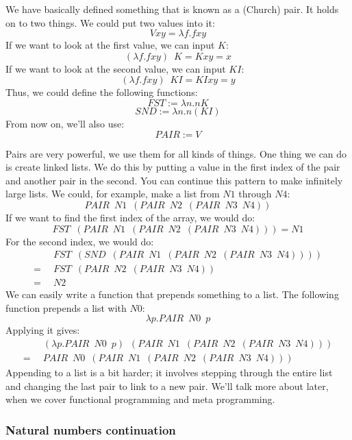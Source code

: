 \documentclass[11pt]{article}
\begin{document}
We have basically defined something that is known as a (Church) pair. It holds
on to two things. We could put two values into it:
\[Vxy=\lambda f.fxy\]
If we want to look at the first value, we can input \(K\):
\[(\lambda f.fxy)\enspace K=Kxy=x\]
If we want to look at the second value, we can input \(KI\):
\[(\lambda f.fxy)\enspace KI=KIxy=y\]
Thus, we could define the following functions:
\[FST:=\lambda n.nK\]
\[SND:=\lambda n.n(KI)\]
From now on, we'll also use:
\[PAIR:=V\]

Pairs are very powerful, we use them for all kinds of things. One thing we can
do is create linked lists. We do this by putting a value in the first index of
the pair and another pair in the second. You can continue this pattern to make
infinitely large lists. We could, for example, make a list from \(N1\) through
\(N4\):
\[PAIR\enspace N1\enspace(PAIR\enspace N2\enspace(PAIR\enspace N3\enspace N4))\]
If we want to find the first index of the array, we would do:
\[FST\enspace(PAIR\enspace N1\enspace(PAIR\enspace N2\enspace(PAIR\enspace N3\enspace N4)))=N1\]
For the second index, we would do:
\begin{align*}
	&FST\enspace(SND\enspace(PAIR\enspace N1\enspace(PAIR\enspace N2\enspace(PAIR\enspace N3\enspace N4))))\\
	=\enspace&FST\enspace(PAIR\enspace N2\enspace(PAIR\enspace N3\enspace N4))\\
	=\enspace&N2
\end{align*}
We can easily write a function that prepends something to a list. The following
function prepends a list with \(N0\):
\[\lambda p.PAIR\enspace N0\enspace p\]
Applying it gives:
\begin{align*}
	&(\lambda p.PAIR\enspace N0\enspace p)\enspace
		(PAIR\enspace N1\enspace(PAIR\enspace N2\enspace(PAIR\enspace N3\enspace N4)))\\
	=\enspace&PAIR\enspace N0\enspace
		(PAIR\enspace N1\enspace(PAIR\enspace N2\enspace(PAIR\enspace N3\enspace N4)))
\end{align*}
Appending to a list is a bit harder; it involves stepping through the entire
list and changing the last pair to link to a new pair. We'll talk more about
later, when we cover functional programming and meta programming.


\subsubsection{Natural numbers continuation}
\end{document}
